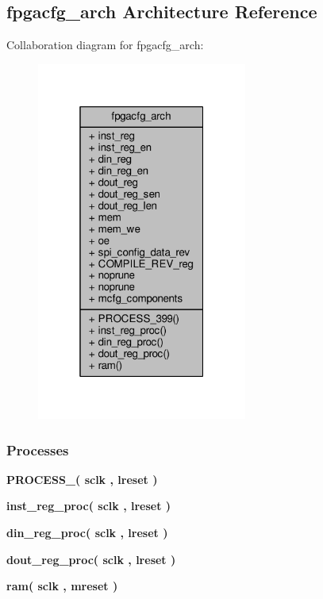 \subsection{fpgacfg\+\_\+arch Architecture Reference}
\label{classfpgacfg_1_1fpgacfg__arch}


Collaboration diagram for fpgacfg\+\_\+arch\+:\nopagebreak
\begin{figure}[H]
\begin{center}
\leavevmode
\includegraphics[width=196pt]{d8/df2/classfpgacfg_1_1fpgacfg__arch__coll__graph}
\end{center}
\end{figure}
\subsubsection*{Processes}
 \begin{DoxyCompactItemize}
\item 
{\bf P\+R\+O\+C\+E\+S\+S\+\_}{\bfseries  ( {\bfseries {\bfseries {\bf sclk}} \textcolor{vhdlchar}{ }} , {\bfseries {\bfseries {\bf lreset}} \textcolor{vhdlchar}{ }} )}
\item 
{\bf inst\+\_\+reg\+\_\+proc}{\bfseries  ( {\bfseries {\bfseries {\bf sclk}} \textcolor{vhdlchar}{ }} , {\bfseries {\bfseries {\bf lreset}} \textcolor{vhdlchar}{ }} )}
\item 
{\bf din\+\_\+reg\+\_\+proc}{\bfseries  ( {\bfseries {\bfseries {\bf sclk}} \textcolor{vhdlchar}{ }} , {\bfseries {\bfseries {\bf lreset}} \textcolor{vhdlchar}{ }} )}
\item 
{\bf dout\+\_\+reg\+\_\+proc}{\bfseries  ( {\bfseries {\bfseries {\bf sclk}} \textcolor{vhdlchar}{ }} , {\bfseries {\bfseries {\bf lreset}} \textcolor{vhdlchar}{ }} )}
\item 
{\bf ram}{\bfseries  ( {\bfseries {\bfseries {\bf sclk}} \textcolor{vhdlchar}{ }} , {\bfseries {\bfseries {\bf mreset}} \textcolor{vhdlchar}{ }} )}
\end{DoxyCompactItemize}
